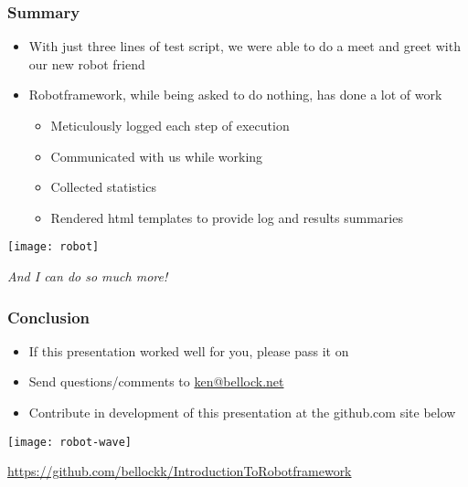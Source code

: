 \documentclass[xcolor=table,handout]{beamer}
\begin{document}
\begin{frame}\frametitle{Summary}
    \begin{itemize}
        \item With just three lines of test script, we were able to do a meet and greet with our new robot friend
        \item Robotframework, while being asked to do nothing, has done a lot of work
            \begin{itemize}
                \item Meticulously logged each step of execution
                \item Communicated with us while working
                \item Collected statistics
                \item Rendered html templates to provide log and results summaries
            \end{itemize}
    \end{itemize}
    \begin{center}
    \texttt{[image: robot]}
        
    \emph{And I can do so much more!}
    \end{center}
\end{frame}

\begin{frame}\frametitle{Conclusion}
    \begin{itemize}
        \item If this presentation worked well for you, please pass it on
        \item Send questions/comments to \href{mailto:ken@bellock.net}{ken@bellock.net}
        \item Contribute in development of this presentation at the github.com site below
    \end{itemize}
    \begin{center}
    \texttt{[image: robot-wave]}

    \footnotesize\url{https://github.com/bellockk/IntroductionToRobotframework}
    \end{center}
\end{frame}
\end{document}
